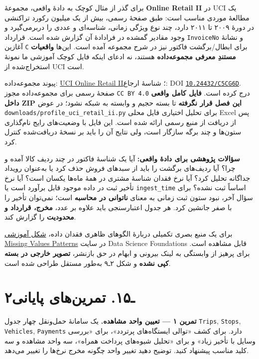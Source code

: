 \documentclass[12pt,a4paper,oneside]{book}
\begin{document}
برای گذر از مثال کوچک به دادهٔ واقعی، مجموعهٔ \textbf{Online Retail II} در UCI یک مطالعهٔ موردی مناسب است: طبق صفحهٔ رسمی، بیش از یک میلیون رکورد تراکنشی در دورهٔ ۲۰۰۹ تا ۲۰۱۱ دارد، چند نوع ویژگی زمانی، شناسه‌ای و عددی را دربرمی‌گیرد و وجود مقادیر گمشده در فرادادهٔ آن گزارش شده است. قرارداد \texttt{InvoiceNo} و نشانهٔ آغازین \texttt{C} برای ابطال/برگشت فاکتور نیز در شرح مجموعه آمده است. این‌ها \textbf{واقعیات مستندِ معرفی مجموعه‌داده} هستند، نه ادعای اینکه فایل کوچک آموزشی ما نمونهٔ استخراج‌شده از UCI است.

پیوند مجموعه‌داده: \href{https://archive.ics.uci.edu/dataset/502/online+retail+ii}{UCI Online Retail II}؛ شناسهٔ ارجاع: DOI \href{https://doi.org/10.24432/C5CG6D}{\texttt{10.24432/C5CG6D}}. صفحهٔ رسمی برای مجموعه‌داده مجوز \texttt{CC\ BY\ 4.0} درج کرده است. \textbf{فایل کامل واقعی داخل ZIP این فصل قرار نگرفته} تا بسته حجیم و وابسته به شبکه نشود؛ در عوض \texttt{downloads/profile\_uci\_retail\_ii.py} برای تحلیل اختیاری فایل محلی Excel پس از دریافت از منبع رسمی ارائه شده است. این فایل با وضعیت‌های رایج نام‌گذاری ستون‌ها و چند برگه سازگار است، ولی نتایج آن را باید بر نسخهٔ دریافت‌شده کنترل کرد.

\textbf{سؤالات پژوهشی برای دادهٔ واقعی:} آیا یک شناسهٔ فاکتور در چند ردیف کالا آمده و چرا؟ آیا ردیف‌های برگشت را باید از سبدهای فروش حذف کرد یا به‌عنوان رویداد جداگانه تحلیل کرد؟ آیا نرخ فقدان شناسهٔ مشتری در همهٔ ماه‌ها یکسان است؟ آیا نرخ تأخیر ثبت در داده موجود قابل برآورد است یا \texttt{ingest\_time} اساساً ثبت نشده؟ برای سؤال آخر، نبود ستون ثبت زمانی به معنای \textbf{ناتوانی در محاسبه} است؛ نمی‌توان تأخیر را با صفر جانشین کرد. هر جدول اعتبارسنجی باید علاوه بر عدد، \textbf{مخرج، قرارداد و محدودیت} را گزارش کند.

برای یک منبع بصری تکمیلی دربارهٔ الگوهای ظاهری فقدان داده، \href{https://hkurzweil.github.io/DataScienceFoundations/external/missing-values-patterns.png}{شکل آموزشی Missing Values Patterns} در سایت Data Science Foundations قابل مشاهده است. برای پرهیز از وابستگی به لینک بیرونی و ابهام در حق بازنشر، \textbf{تصویر خارجی در بسته کپی نشده} و شکل ۲ـ۹ به‌طور مستقل طراحی شده است.

\section{۲ـ۱۵. تمرین‌های پایانی}\label{ux640ux6f1ux6f5.-ux62aux645ux631ux6ccux646ux647ux627ux6cc-ux67eux627ux6ccux627ux646ux6cc}

\textbf{تمرین ۱ --- تعیین واحد مشاهده.} یک سامانهٔ حمل‌ونقل چهار جدول \texttt{Trips}, \texttt{Stops}, \texttt{Vehicles}, \texttt{Payments} دارد. برای کشف «توالی ایستگاه‌های پرتردد»، برای «بررسی وسایل با تأخیر زیاد» و برای «تحلیل شیوه‌های پرداخت همراه»، سه واحد مشاهده و سه کلید مناسب پیشنهاد کنید. توضیح دهید تغییر واحد چگونه مخرج نرخ‌ها را تغییر می‌دهد.
\end{document}
